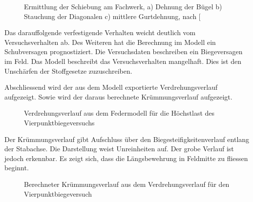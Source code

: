 \documentclass[
  11pt,
  letterpaper,
]{scrreprt}
\begin{document}
\begin{figure}[H]


\caption{\label{fig-schubverf_sigrist}Ermittlung der Schiebung am
Fachwerk, a) Dehnung der Bügel b) Stauchung der Diagonalen c) mittlere
Gurtdehnung, nach {[}\citeproc{ref-sigrist_zum_1995}{4}{]}}

\end{figure}%

Das darauffolgende verfestigende Verhalten weicht deutlich vom
Versuchsverhalten ab. Des Weiteren hat die Berechnung im Modell ein
Schubversagen prognostiziert. Die Versuchsdaten beschreiben ein
Biegeversagen im Feld. Das Modell beschreibt das Versuchsverhalten
mangelhaft. Dies ist den Unschärfen der Stoffgesetze zuzuschreiben.

Abschliessend wird der aus dem Modell exportierte Verdrehungsverlauf
aufgezeigt. Sowie wird der daraus berechnete Krümmungsverlauf
aufgezeigt.

\begin{figure}[H]


\caption{\label{fig-phi-max-sv14}Verdrehungsverlauf aus dem Federmodell
für die Höchstlast des Vierpunktbiegeversuchs}

\end{figure}%

Der Krümmungsverlauf gibt Aufschluss über den Biegesteifigkeitenverlauf
entlang der Stabachse. Die Darstellung weist Unreinheiten auf. Der grobe
Verlauf ist jedoch erkennbar. Es zeigt sich, dass die Längsbewehrung in
Feldmitte zu fliessen beginnt.

\begin{figure}[H]


\caption{\label{fig-chi-max-sv14}Berechneter Krümmungsverlauf aus dem
Verdrehungsverlauf für den Vierpunktbiegeversuch}

\end{figure}%
\end{document}
